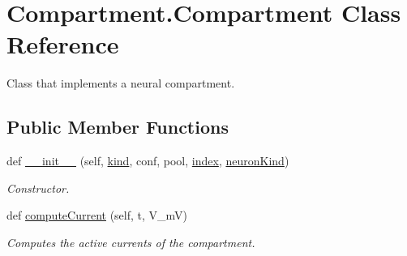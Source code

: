 \hypertarget{class_compartment_1_1_compartment}{}\section{Compartment.\+Compartment Class Reference}
\label{class_compartment_1_1_compartment}


Class that implements a neural compartment.  


\subsection*{Public Member Functions}
\begin{DoxyCompactItemize}
\item 
def \hyperlink{class_compartment_1_1_compartment_a207d311a27cc1d027abb021c70a30509}{\+\_\+\+\_\+init\+\_\+\+\_\+} (self, \hyperlink{class_compartment_1_1_compartment_a74f2266a2231c4a81cc680bc201f0ffd}{kind}, conf, pool, \hyperlink{class_compartment_1_1_compartment_a9402ef46ede52521ebbb9e9d2d68d631}{index}, \hyperlink{class_compartment_1_1_compartment_ad42f32769afd94d1e7d7d54008efb6fa}{neuron\+Kind})
\begin{DoxyCompactList}\small\item\em Constructor. \end{DoxyCompactList}\item 
def \hyperlink{class_compartment_1_1_compartment_a31d23a4d2dba419ac4d0e9b8e296a734}{compute\+Current} (self, t, V\+\_\+mV)
\begin{DoxyCompactList}\small\item\em Computes the active currents of the compartment. \end{DoxyCompactList}\end{DoxyCompactItemize}
